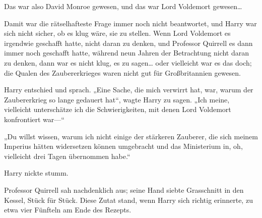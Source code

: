 Das war also David Monroe gewesen, und das war Lord Voldemort gewesen…

Damit war die rätselhafteste Frage immer noch nicht beantwortet, und Harry war sich nicht sicher, ob es klug wäre, sie zu stellen. Wenn Lord Voldemort es irgendwie geschafft hatte, nicht daran zu denken, und Professor Quirrell es dann immer noch geschafft hatte, während neun Jahren der Betrachtung nicht daran zu denken, dann war es nicht klug, es zu sagen… oder vielleicht war es das doch; die Qualen des Zaubererkrieges waren nicht gut für Großbritannien gewesen.

Harry entschied und sprach.
„Eine Sache, die mich verwirrt hat, war, warum der Zaubererkrieg so lange gedauert hat“, wagte Harry zu sagen. „Ich meine, vielleicht unterschätze ich die Schwierigkeiten, mit denen Lord Voldemort konfrontiert war—“

„Du willst wissen, warum ich nicht einige der stärkeren Zauberer, die sich meinem Imperius hätten widersetzen können umgebracht und das Ministerium in, oh, vielleicht drei Tagen übernommen habe.“

Harry nickte stumm.

Professor Quirrell sah nachdenklich aus; seine Hand siebte Grasschnitt in den Kessel, Stück für Stück. Diese Zutat stand, wenn Harry sich richtig erinnerte, zu etwa vier Fünfteln am Ende des Rezepts.

